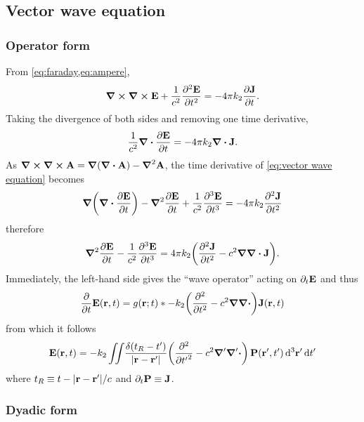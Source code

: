 \subsection{\label{appendix:vector wave equation}Vector wave equation}

\subsubsection{Operator form}

From \cref{eq:faraday,eq:ampere},
\begin{equation}
  \curl{\curl{\vb{E}}} + \frac{1}{c^2} \pdv[2]{\vb{E}}{t} = -4\pi k_2 \pdv{\vb{J}}{t}.
  \label{eq:vector wave equation}
\end{equation}
Taking the divergence of both sides and removing one time derivative,
\begin{equation*}
  \frac{1}{c^2} \div{\pdv{\vb{E}}{t}} = -4 \pi k_2 \div{\vb{J}}.
\end{equation*}
As $\curl{\curl{\vb{A}}} = \grad{\qty(\div{\vb{A}})} - \grad^2{\vb{A}}$, the time derivative of \cref{eq:vector wave equation} becomes
\begin{equation*}
  \grad{\qty(\div{\pdv{\vb{E}}{t}})} - \grad^2 \pdv{\vb{E}}{t} + \frac{1}{c^2} \pdv[3]{\vb{E}}{t} = -4\pi k_2 \pdv[2]{\vb{J}}{t}
\end{equation*}
therefore
\begin{equation*} \grad^2 \pdv{\vb{E}}{t} - \frac{1}{c^2} \pdv[3]{\vb{E}}{t} = 4\pi k_2 \qty(\pdv[2]{\vb{J}}{t} - c^2 \grad \div{\vb{J}}).
\end{equation*}
Immediately, the left-hand side gives the ``wave operator'' acting on $\partial_t \vb{E}$ and thus
\begin{equation*}
  \pdv{t} \vb{E}(\vb{r}, t) = g(\vb{r}; t) \ast -k_2\qty(\pdv[2]{t} - c^2 \grad \div) \vb{J}(\vb{r}, t)
\end{equation*}
from which it follows
\begin{equation}
  \vb{E}(\vb{r}, t) = -k_2 \siint \kern0.1em \frac{\delta\qty(t_R - t' )}{\abs{\vb{r} - \vb{r}'}} \qty(\pdv[2]{{t'}} - c^2 \grad' \grad'\boldsymbol{\cdot}) \, \vb{P}(\vb{r}', t') \dd[3]{\vb{r}'} \dd{t'}
  \label{eq:operator form}
\end{equation}
where $t_R \equiv t - \abs{\vb{r} - \vb{r}'}/c$ and $\partial_t \vb{P} \equiv \vb{J}$.

\subsubsection{Dyadic form}

